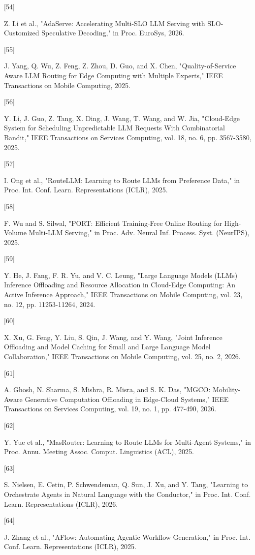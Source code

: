 \hypertarget{ref:54}{[54]} Z. Li et al., "AdaServe: Accelerating Multi-SLO LLM Serving with SLO-Customized Speculative Decoding," in Proc. EuroSys, 2026.

\hypertarget{ref:55}{[55]} J. Yang, Q. Wu, Z. Feng, Z. Zhou, D. Guo, and X. Chen, "Quality-of-Service Aware LLM Routing for Edge Computing with Multiple Experts," IEEE Transactions on Mobile Computing, 2025.

\hypertarget{ref:56}{[56]} Y. Li, J. Guo, Z. Tang, X. Ding, J. Wang, T. Wang, and W. Jia, "Cloud-Edge System for Scheduling Unpredictable LLM Requests With Combinatorial Bandit," IEEE Transactions on Services Computing, vol. 18, no. 6, pp. 3567-3580, 2025.

\hypertarget{ref:57}{[57]} I. Ong et al., "RouteLLM: Learning to Route LLMs from Preference Data," in Proc. Int. Conf. Learn. Representations (ICLR), 2025.

\hypertarget{ref:58}{[58]} F. Wu and S. Silwal, "PORT: Efficient Training-Free Online Routing for High-Volume Multi-LLM Serving," in Proc. Adv. Neural Inf. Process. Syst. (NeurIPS), 2025.

\hypertarget{ref:59}{[59]} Y. He, J. Fang, F. R. Yu, and V. C. Leung, "Large Language Models (LLMs) Inference Offloading and Resource Allocation in Cloud-Edge Computing: An Active Inference Approach," IEEE Transactions on Mobile Computing, vol. 23, no. 12, pp. 11253-11264, 2024.

\hypertarget{ref:60}{[60]} X. Xu, G. Feng, Y. Liu, S. Qin, J. Wang, and Y. Wang, "Joint Inference Offloading and Model Caching for Small and Large Language Model Collaboration," IEEE Transactions on Mobile Computing, vol. 25, no. 2, 2026.

\hypertarget{ref:61}{[61]} A. Ghosh, N. Sharma, S. Mishra, R. Misra, and S. K. Das, "MGCO: Mobility-Aware Generative Computation Offloading in Edge-Cloud Systems," IEEE Transactions on Services Computing, vol. 19, no. 1, pp. 477-490, 2026.

\hypertarget{ref:62}{[62]} Y. Yue et al., "MasRouter: Learning to Route LLMs for Multi-Agent Systems," in Proc. Annu. Meeting Assoc. Comput. Linguistics (ACL), 2025.

\hypertarget{ref:63}{[63]} S. Nielsen, E. Cetin, P. Schwendeman, Q. Sun, J. Xu, and Y. Tang, "Learning to Orchestrate Agents in Natural Language with the Conductor," in Proc. Int. Conf. Learn. Representations (ICLR), 2026.

\hypertarget{ref:64}{[64]} J. Zhang et al., "AFlow: Automating Agentic Workflow Generation," in Proc. Int. Conf. Learn. Representations (ICLR), 2025.

